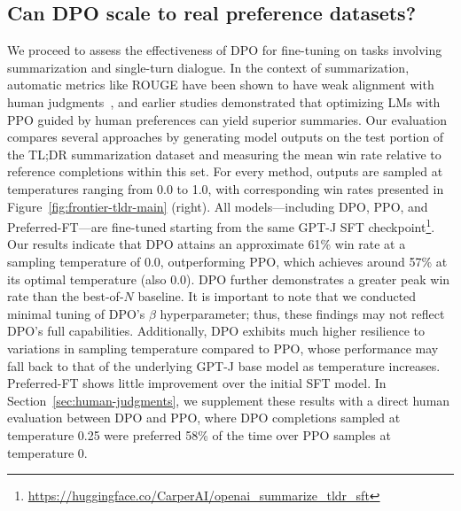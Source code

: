 \subsection{Can DPO scale to real preference datasets?}
\label{sec:dpo-real-datasets}
We proceed to assess the effectiveness of DPO for fine-tuning on tasks involving summarization and single-turn dialogue. In the context of summarization, automatic metrics like ROUGE have been shown to have weak alignment with human judgments~\citep{stiennon2022learning}, and earlier studies demonstrated that optimizing LMs with PPO guided by human preferences can yield superior summaries. Our evaluation compares several approaches by generating model outputs on the test portion of the TL;DR summarization dataset and measuring the mean win rate relative to reference completions within this set. For every method, outputs are sampled at temperatures ranging from 0.0 to 1.0, with corresponding win rates presented in Figure~\ref{fig:frontier-tldr-main} (right). All models—including DPO, PPO, and Preferred-FT—are fine-tuned starting from the same GPT-J SFT checkpoint\footnote{\url{https://huggingface.co/CarperAI/openai_summarize_tldr_sft}}. Our results indicate that DPO attains an approximate 61\% win rate at a sampling temperature of 0.0, outperforming PPO, which achieves around 57\% at its optimal temperature (also 0.0). DPO further demonstrates a greater peak win rate than the best-of-$N$ baseline. It is important to note that we conducted minimal tuning of DPO's $\beta$ hyperparameter; thus, these findings may not reflect DPO’s full capabilities. Additionally, DPO exhibits much higher resilience to variations in sampling temperature compared to PPO, whose performance may fall back to that of the underlying GPT-J base model as temperature increases. Preferred-FT shows little improvement over the initial SFT model. In Section~\ref{sec:human-judgments}, we supplement these results with a direct human evaluation between DPO and PPO, where DPO completions sampled at temperature 0.25 were preferred 58\% of the time over PPO samples at temperature 0.

